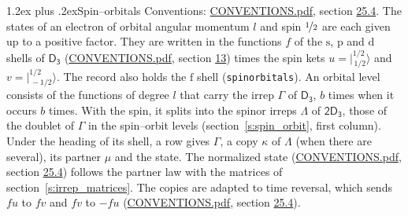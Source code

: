 \documentclass[10pt,a4paper]{article}
\makeatletter
\renewcommand\section{\@startsection{section}{1}{\z@}{-3ex plus -1ex minus -.2ex}%
  {1.2ex plus .2ex}{\normalfont\large\sffamily\bfseries\color{parttitle}}}
\numberwithin{equation}{section}
\newcommand{\grp}[1]{\mathsf{#1}}
\newcommand{\orbital}[1]{\mathrm{#1}}
\newcommand{\mult}{\kappa}
\newcommand{\intx}{\mu}
\newcommand{\jm}[2]{\bigl\lvert{}^{#1}_{\,#2}\bigr\rangle}
\makeatother
\begin{document}
\section{Spin--orbitals}\label{s:spin_orbitals}
Conventions: \href{../../CONVENTIONS.pdf}{CONVENTIONS.pdf}, section \href{../../CONVENTIONS.pdf\#conv.25.4}{25.4}.
\leavevmode\label{n:index.orbital.l}The states of an electron of orbital angular momentum $l$ and spin $\nicefrac{1}{2}$ are each given up to a positive factor. \label{n:local.spinor.uv}\label{n:local.function.f}They are written in the functions $f$ of the $\orbital{s}$, $\orbital{p}$ and $\orbital{d}$ shells of \href{../../../rotation/data/pdf/D3.pdf}{$\grp{D_{3}}$} (\href{../../CONVENTIONS.pdf}{CONVENTIONS.pdf}, section \href{../../../rotation/CONVENTIONS.pdf\#conv.13}{13}) times the spin kets $u = \jm{1/2}{1/2}$ and $v = \jm{1/2}{-1/2}$. The record also holds the $\orbital{f}$ shell (\texttt{spinorbitals}). An orbital level consists of the functions of degree $l$ that carry the irrep $\Gamma$ of \href{../../../rotation/data/pdf/D3.pdf}{$\grp{D_{3}}$}, $b$ times when it occurs $b$ times. With the spin, it splits into the spinor irreps $\Lambda$ of $\grp{2D_{3}}$, those of the doublet of $\Gamma$ in the spin--orbit levels (section~\ref{s:spin_orbit}, first column). \label{n:head.state}Under the heading of its shell, a row gives $\Gamma$, a copy $\mult$ of $\Lambda$ (when there are several), its partner $\intx$ and the state. The normalized state (\href{../../CONVENTIONS.pdf}{CONVENTIONS.pdf}, section \href{../../CONVENTIONS.pdf\#conv.25.4}{25.4}) follows the partner law with the matrices of section~\ref{s:irrep_matrices}. The copies are adapted to time reversal, which sends $f u$ to $f v$ and $f v$ to $-f u$ (\href{../../CONVENTIONS.pdf}{CONVENTIONS.pdf}, section \href{../../CONVENTIONS.pdf\#conv.25.4}{25.4}).
\end{document}
